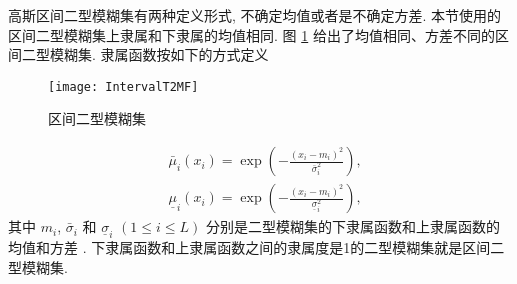 高斯区间二型模糊集有两种定义形式,  不确定均值或者是不确定方差. 本节使用的区间二型模糊集上隶属和下隶属的均值相同. 图 \ref{TFLN:fig1-2} 给出了均值相同、方差不同的区间二型模糊集. 隶属函数按如下的方式定义
\begin{figure} [!htp]
    \begin{center}
        \texttt{[image: IntervalT2MF]}
    \end{center}
    \caption{区间二型模糊集}
    \label{TFLN:fig1-2}
\end{figure}
\begin{align}
    &\bar{\mu} _{i} (x_i)=\exp\left(- \frac{(x_i-m_{i} )^2} {\bar{\sigma} ^2_{i} }  \right),\label{IT2TSKNM_mu1} \\
    &\underline{\mu} _{i} (x_i)=\exp\left(- \frac{(x_i-m_{i} )^2} {\underline{\sigma} ^2_{i} }  \right),\label{IT2TSKNM_mu2}
\end{align}
其中 $m_{i} $, $\bar{\sigma} _{i} $ 和 $\underline{\sigma} _{i} $ $(1\leq i\leq L)$ 分别是二型模糊集的下隶属函数和上隶属函数的均值和方差 . 下隶属函数和上隶属函数之间的隶属度是1的二型模糊集就是区间二型模糊集.

